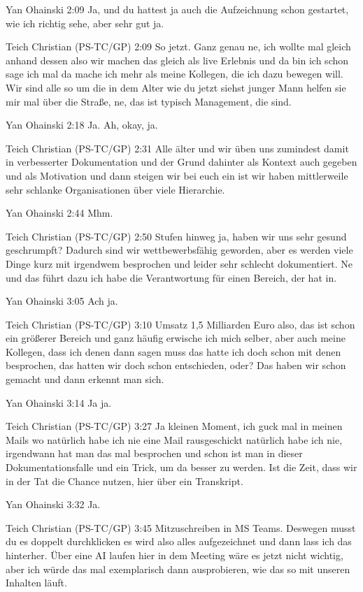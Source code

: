 Yan Ohainski   2:09
Ja, und du hattest ja auch die Aufzeichnung schon gestartet, wie ich richtig sehe, aber sehr gut ja.

Teich Christian (PS-TC/GP)   2:09
So jetzt.
Ganz genau ne, ich wollte mal gleich anhand dessen also wir machen das gleich als live Erlebnis und da bin ich schon sage ich mal da mache ich mehr als meine Kollegen, die ich dazu bewegen will. Wir sind alle so um die in dem Alter wie du jetzt siehst junger Mann helfen sie mir mal über die Straße, ne, das ist typisch Management, die sind.

Yan Ohainski   2:18
Ja.
Ah, okay, ja.

Teich Christian (PS-TC/GP)   2:31
Alle älter und wir üben uns zumindest damit in verbesserter Dokumentation und der Grund dahinter als Kontext auch gegeben und als Motivation und dann steigen wir bei euch ein ist wir haben mittlerweile sehr schlanke Organisationen über viele Hierarchie.

Yan Ohainski   2:44
Mhm.

Teich Christian (PS-TC/GP)   2:50
Stufen hinweg ja, haben wir uns sehr gesund geschrumpft? Dadurch sind wir wettbewerbsfähig geworden, aber es werden viele Dinge kurz mit irgendwem besprochen und leider sehr schlecht dokumentiert. Ne und das führt dazu ich habe die Verantwortung für einen Bereich, der hat in.

Yan Ohainski   3:05
Ach ja.

Teich Christian (PS-TC/GP)   3:10
Umsatz 1,5 Milliarden Euro also, das ist schon ein größerer Bereich und ganz häufig erwische ich mich selber, aber auch meine Kollegen, dass ich denen dann sagen muss das hatte ich doch schon mit denen besprochen, das hatten wir doch schon entschieden, oder? Das haben wir schon gemacht und dann erkennt man sich.

Yan Ohainski   3:14
Ja ja.

Teich Christian (PS-TC/GP)   3:27
Ja kleinen Moment, ich guck mal in meinen Mails wo natürlich habe ich nie eine Mail rausgeschickt natürlich habe ich nie, irgendwann hat man das mal besprochen und schon ist man in dieser Dokumentationsfalle und ein Trick, um da besser zu werden. Ist die Zeit, dass wir in der Tat die Chance nutzen, hier über ein Transkript.

Yan Ohainski   3:32
Ja.

Teich Christian (PS-TC/GP)   3:45
Mitzuschreiben in MS Teams. Deswegen musst du es doppelt durchklicken es wird also alles aufgezeichnet und dann lass ich das hinterher. Über eine AI laufen hier in dem Meeting wäre es jetzt nicht wichtig, aber ich würde das mal exemplarisch dann ausprobieren, wie das so mit unseren Inhalten läuft.

